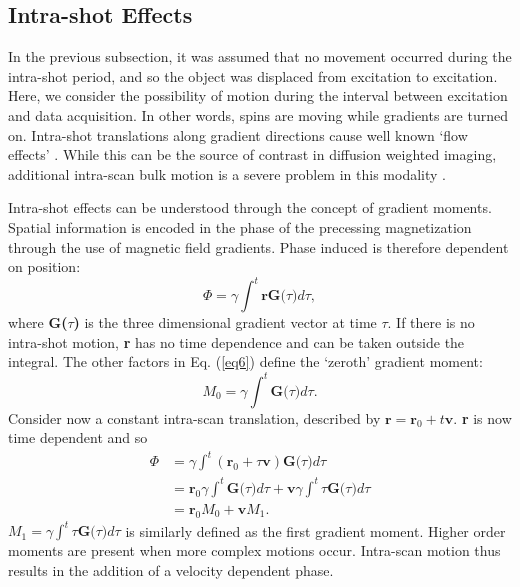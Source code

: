 \documentclass[class=article, crop=false]{standalone}
\begin{document}
\subsection{Intra-shot Effects}
In the previous subsection, it was assumed that no movement occurred during the intra-shot period, and so the object was displaced from excitation to excitation. Here, we consider the possibility of motion during the interval between excitation and data acquisition. In other words, spins are moving while gradients are turned on. Intra-shot translations along gradient directions cause well known `flow effects' \parencite{Barth1985}. While this can be the source of contrast in diffusion weighted imaging, additional intra-scan bulk motion is a severe problem in this modality \parencite{LeBihan2006}.
\par
Intra-shot effects can be understood through the concept of gradient moments. Spatial information is encoded in the phase of the precessing magnetization through the use of magnetic field gradients. Phase induced is therefore dependent on position:
\begin{equation} \label{eq6}
	\Phi = \gamma\int^{t}\textbf{r}\textbf{G($\tau$)}d\tau,
\end{equation}
where \textbf{G($\tau$)} is the three dimensional gradient vector at time $\tau$. If there is no intra-shot motion, \textbf{r} has no time dependence and can be taken outside the integral. The other factors in Eq. (\ref{eq6}) define the `zeroth' gradient moment:
\begin{equation} \label{eq7}
	M_0 = \gamma\int^{t}\textbf{G($\tau$)}d\tau.
\end{equation}
Consider now a constant intra-scan translation, described by $\textbf{r} = \textbf{r}_0 + t\textbf{v}$. \textbf{r} is now time dependent and so
\begin{equation} \label{eq8}
	\begin{split}
		\Phi & = \gamma\int^t(\textbf{r}_0 + \tau\textbf{v})\textbf{G($\tau$)}d\tau \\
			 & = \textbf{r}_0\gamma\int^t\textbf{G($\tau$)}d\tau + \textbf{v}\gamma\int^t\tau\textbf{G($\tau$)}d\tau \\
			 & = \textbf{r}_0M_0 + \textbf{v}M_1.
	\end{split}
\end{equation}
$M_1 = \gamma\int^t\tau\textbf{G($\tau$)}d\tau$ is similarly defined as the first gradient moment. Higher order moments are present when more complex motions occur. Intra-scan motion thus results in the addition of a velocity dependent phase.
\end{document}

